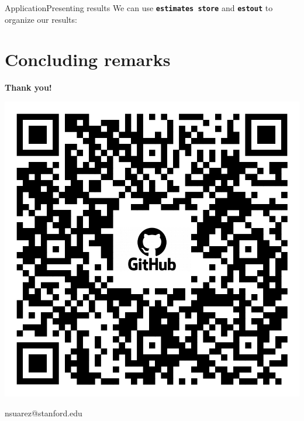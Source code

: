 \documentclass[aspectratio=169]{beamer}
\begin{document}
\begin{frame}{Application}{Presenting results}
We can use \textbf{\texttt{estimates store}} and \textbf{\texttt{estout}} to organize our results:\\
\vspace{0.37cm}
\centering
{}
\end{frame}


\section{Concluding remarks}



\begin{frame}
  \begin{center}
  \Huge \textbf{Thank you!}
  \end{center}
\centering
\includegraphics[scale=0.14]{QR.png}
  \begin{center}
  nsuarez@stanford.edu
  \end{center}
\end{frame}
\end{document}
